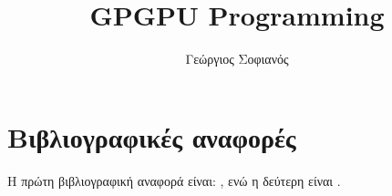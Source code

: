 \documentclass[12pt,a4paper,twoside]{book}
\author{Γεώργιος Σοφιανός}
\title{GPGPU Programming}
\begin{document}

 
\tableofcontents







\section{Βιβλιογραφικές αναφορές}
H πρώτη βιβλιογραφική αναφορά είναι: \parencite{opencl}, ενώ η δεύτερη είναι \parencite{papadopoulos}.

\printbibliography[title={Βιβλιογραφία}]
\end{document}
